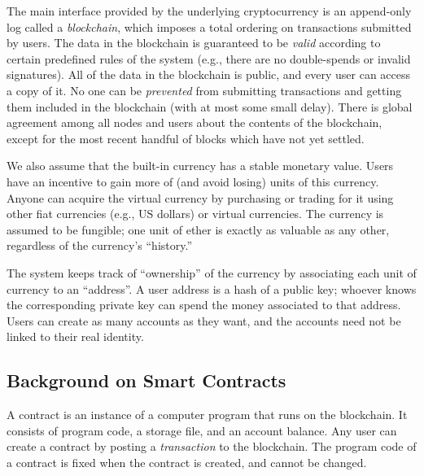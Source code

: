 \documentclass[10pt,twocolumn,letterpaper]{article}
\newcommand{\ignore}[1]{}
\begin{document}
\ignore{We shall make some simplifying assumptions 
about the security model of the underlying cryptocurrency.
Loosely speaking, we assume that the
cryptocurrency has a secure and incentive compatible
consensus protocol. 
In reality, existing decentralized cryptocurrencies
achieve only heuristic security; designing a provably  
secure decentralized consensus protocol under
rationality assumptions is a topic of 
future research.
}

The main interface provided by the underlying cryptocurrency is an append-only log called a \emph{blockchain}, which imposes a total ordering on transactions submitted by users. The data in the blockchain is guaranteed to be \emph{valid} according to certain predefined rules of the system (e.g., there are no double-spends or invalid signatures). All of the data in the blockchain is public, and every user can access a copy of it. No one can be \emph{prevented} from submitting transactions and getting them included in the blockchain (with at most some small delay). There is global agreement among all nodes and users about the contents of the blockchain,  except for the most recent handful of blocks which have not yet settled.

We also assume that the built-in currency has a stable monetary value. Users have an incentive to gain more of (and avoid losing) units of this currency. Anyone can acquire 
the virtual currency by purchasing or trading for it using 
other fiat currencies (e.g., US dollars) or virtual currencies. The currency is assumed to be fungible; one unit of ether is exactly as valuable as any other, regardless of the currency's ``history.''

The system keeps track of ``ownership'' of the currency by associating each unit of currency to an ``address''. 
A user address is a hash of a public key; whoever knows the corresponding private key can spend the money associated to that address. Users can create as many accounts as they want, and the accounts need not be linked to their real identity.

\subsection{Background on Smart Contracts}
A contract is an instance of a computer program that runs on the blockchain. It consists of program code, a storage file, and an account balance.
Any user can create a contract by posting a {\it transaction} to the blockchain.
The program code of a contract is fixed when the contract is created, and cannot be changed.
\end{document}
